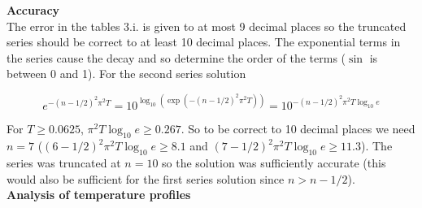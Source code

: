 \documentclass[12pt]{extarticle}
\begin{document}
\textbf{Accuracy}\\

The error in the tables 3.i. is given to at most 9 decimal places so the truncated series should be correct to at least 10 decimal places. The exponential terms in the series cause the decay and so determine the order of the terms ($\sin$ is between 0 and 1). For the second series solution

$$e^{-(n-1/2)^2\pi^2 T} = 10^{\log_{10}(\exp(-(n-1/2)^2\pi^2 T))} = 10^{-(n-1/2)^2\pi^2 T\log_{10}e}$$

For $T \geq 0.0625$, $\pi^2 T \log_{10}e \geq 0.267$. So to be correct to 10 decimal places we need $n=7$ ($(6-1/2)^2\pi^2 T \log_{10}e \geq 8.1$ and $(7-1/2)^2\pi^2 T \log_{10}e \geq 11.3$). The series was truncated at $n=10$ so the solution was sufficiently accurate (this would also be sufficient for the first series solution since $n > n-1/2$). \\

\textbf{Analysis of temperature profiles}
\end{document}
